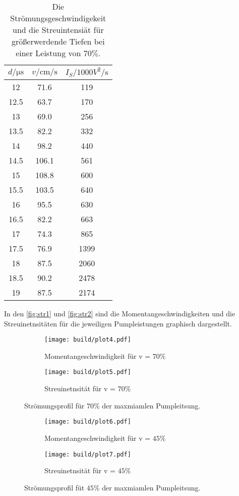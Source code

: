 \begin{table}[H]
    \centering
    \caption{Die Strömungsgeschwindigekeit und die Streuintensiät für größerwerdende Tiefen bei einer Leistung von $70 \%$.}
    \label{tab:sp2}
\begin{tabular}{c c c}
    \toprule
    $d / \si{\micro\second}$ & $ v / \si{\centi \meter \per \second}$ & $I_S / 1000 \si{ V^2 \per \second} $\\
    \midrule
      12 &   71.6 &  119 \\
    12.5 &   63.7 &  170 \\
      13 &   69.0 &  256 \\
    13.5 &  82.2 &  332 \\
      14 &  98.2 &  440 \\
    14.5 &  106.1 &  561 \\
      15 &  108.8 &  600 \\
    15.5 &  103.5 &  640 \\
      16 &  95.5 &  630 \\
    16.5 &  82.2 &  663 \\
      17 &  74.3 &  865 \\
    17.5 &  76.9 &  1399 \\
      18 &  87.5 &  2060 \\
    18.5 &  90.2 & 2478 \\
      19 &  87.5 & 2174 \\
    \bottomrule
    \end{tabular}
\end{table}

In den \autoref{fig:str1} und \autoref{fig:str2} sind die Momentangeschwindigkeiten und die Streuinetnsitäten für die jeweiligen
Pumpleistungen graphisch dargestellt.


\begin{figure}
  \begin{subfigure}{0.48\textwidth}
    \centering
    \texttt{[image: build/plot4.pdf]}
    \caption{Momentangeschwindigkeit für v = $70\%$}
    \label{fig:plot4}
  \end{subfigure}
  \hfill
  \begin{subfigure}{0.48\textwidth}
    \centering
    \texttt{[image: build/plot5.pdf]}
    \caption{Streuinetnsität für v = $70\%$}
    \label{fig:plot5}
  \end{subfigure}
  \caption{Strömungsprofil für $70\%$ der maxmiamlen Pumpleitsung. }
  \label{fig:str1}
\end{figure}

\begin{figure}
  \begin{subfigure}{0.48\textwidth}
    \centering
    \texttt{[image: build/plot6.pdf]}
    \caption{Momentangeschwindigkeit für v = $45\%$}
    \label{fig:plot6}
  \end{subfigure}
  \hfill
  \begin{subfigure}{0.48\textwidth}
    \centering
    \texttt{[image: build/plot7.pdf]}
    \caption{Streuinetnsität für v = $45\%$}
    \label{fig:plot7}
  \end{subfigure}
  \caption{Strömungsprofil füt $45\%$ der maxmiamlen Pumpleitsung.}
  \label{fig:str2}
\end{figure}